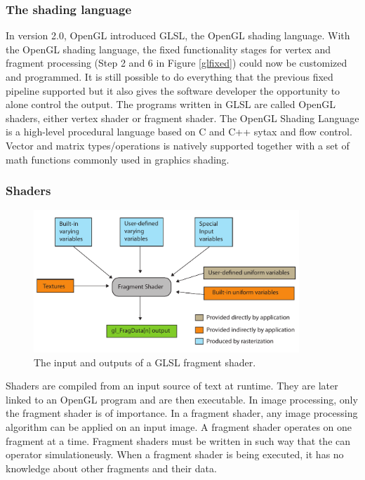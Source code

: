\subsubsection{The shading language}

In version 2.0, OpenGL introduced GLSL, the OpenGL shading language. With the OpenGL shading language, the fixed functionality stages for vertex and fragment processing (Step 2 and 6 in Figure \ref{glfixed}) could now be customized and programmed. It is still possible to do everything that the previous fixed pipeline supported but it also gives the software developer the opportunity to alone control the output. The programs written in GLSL are called OpenGL shaders, either vertex shader or fragment shader. The OpenGL Shading Language is a high-level procedural language based on C and C++ sytax and flow control. Vector and matrix types/operations is natively supported together with a set of  math functions commonly used in graphics shading.
\newline

\subsubsection{Shaders}

\begin{figure}[ht!]
\centering
\includegraphics[width=100mm]{img/frag.pdf}
\caption{The input and outputs of a GLSL fragment shader.}
\label{glfrag}
\end{figure}

Shaders are compiled from an input source of text at runtime. They are later linked to an OpenGL program and are then executable. In image processing, only the fragment shader is of importance. In a fragment shader, any image processing algorithm can be applied on an input image. A fragment shader operates on one fragment at a time. Fragment shaders must be written in such way that the can operator simulationeusly. When a fragment shader is being executed, it has no knowledge about other fragments and their data. 
\newline

